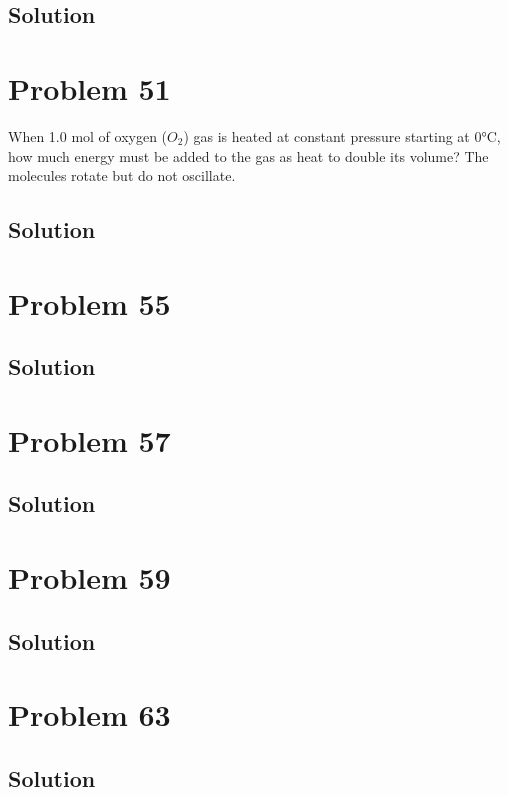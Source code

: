 \documentclass[12pt]{article}
\begin{document}
        \subsection{Solution}

    \pagebreak
    \section{Problem 51}
        When 1.0 mol of oxygen ($O_2$) gas is heated at constant pressure starting at 0°C, how much energy must be added to the gas as heat to double its volume? 
        The molecules rotate but do not oscillate.

        \subsection{Solution}

    \pagebreak
    \section{Problem 55}

        \subsection{Solution}

    \pagebreak
    \section{Problem 57}

        \subsection{Solution}

    \pagebreak
    \section{Problem 59}

        \subsection{Solution}

    \pagebreak
    \section{Problem 63}

        \subsection{Solution}
\end{document}

